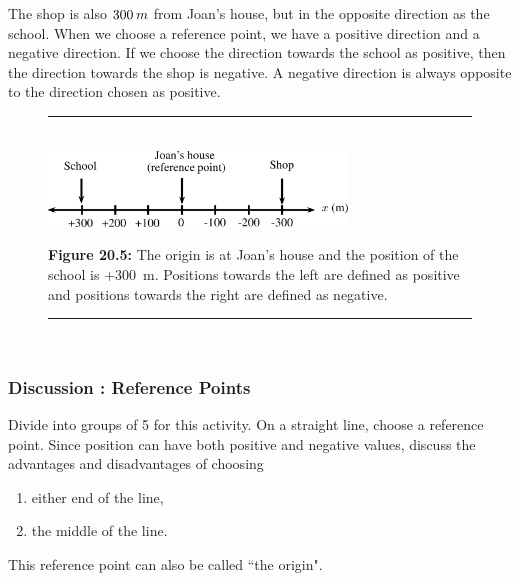         \label{m38787*id62778}The shop is also $300\phantom{\rule{2pt}{0ex}}m$ from Joan's house, but in the opposite direction as the school. When we choose a reference point, we have a positive direction and a negative direction. If we choose the direction towards the school as positive, then the direction towards the shop is negative. A negative direction is always opposite to the direction chosen as positive.\par 
    \setcounter{subfigure}{0}
	\begin{figure}[H] %
    \begin{center}
    \rule[.1in]{\figurerulewidth}{.005in} \\
        \label{m38787*uid8!!!underscore!!!media}\label{m38787*uid8!!!underscore!!!printimage}\includegraphics[width=300px]{col11305.imgs/m38787_PG10C2_004.png} %
      \vspace{2pt}
    \vspace{\rubberspace}\par \begin{cnxcaption}
	  \small \textbf{Figure 20.5: }The origin is at Joan's house and the position of the school is +300~m. Positions towards the left are defined as positive and positions towards the right are defined as negative.
	\end{cnxcaption}
    \vspace{.1in}
    \rule[.1in]{\figurerulewidth}{.005in} \\
    \end{center}
 \end{figure}       
\label{m38787*secfhsst!!!underscore!!!id127}
            \subsubsection{  Discussion : Reference Points }
            \nopagebreak
        \label{m38787*id62809}Divide into groups of 5 for this activity.
On a straight line, choose a reference point. Since position can have both positive and negative values, discuss the advantages and disadvantages of choosing\par 
        \label{m38787*id62816}\begin{enumerate}[noitemsep, label=\textbf{\arabic*}. ] 
            \label{m38787*uid9}\item either end of the line,
\label{m38787*uid10}\item the middle of the line.
\end{enumerate}
        \label{m38787*id62843}This reference point can also be called ``the origin". \par 
\label{m38787*secfhsst!!!underscore!!!id138}
